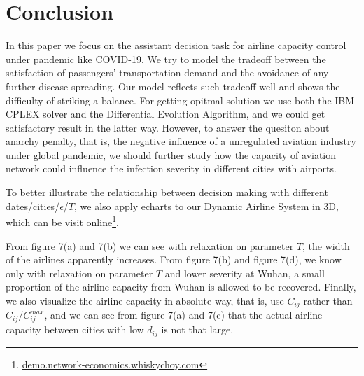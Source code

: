 \section{Conclusion}
In this paper we focus on the assistant decision task for airline capacity control under pandemic like COVID-19. We try to model the tradeoff between the satisfaction of passengers' transportation demand and the avoidance of any further disease spreading. Our model reflects such tradeoff well and shows the difficulty of striking a balance. For getting opitmal solution we use both the IBM CPLEX solver and the Differential Evolution Algorithm, and we could get satisfactory result in the latter way. However, to answer the quesiton about anarchy penalty, that is, the negative influence of a unregulated aviation industry under global pandemic, we should further study how the capacity of aviation network could influence the infection severity in different cities with airports.

To better illustrate the relationship between decision making with different dates/cities/$\epsilon$/$T$, we also apply echarts to our Dynamic Airline System in 3D, which can be visit online\footnote{\url{demo.network-economics.whiskychoy.com}}.

From figure 7(a) and 7(b) we can see with relaxation on parameter $T$, the width of the airlines apparently increases. From figure 7(b) and figure 7(d), we know only with relaxation on parameter $T$ and lower severity at Wuhan, a small proportion of the airline capacity from Wuhan is allowed to be recovered. Finally, we also visualize the airline capacity in absolute way, that is, use $C_{ij}$ rather than $C_{ij}/C_{ij}^{max}$, and we can see from figure 7(a) and 7(c) that the actual airline capacity between cities with low $d_{ij}$ is not that large.

